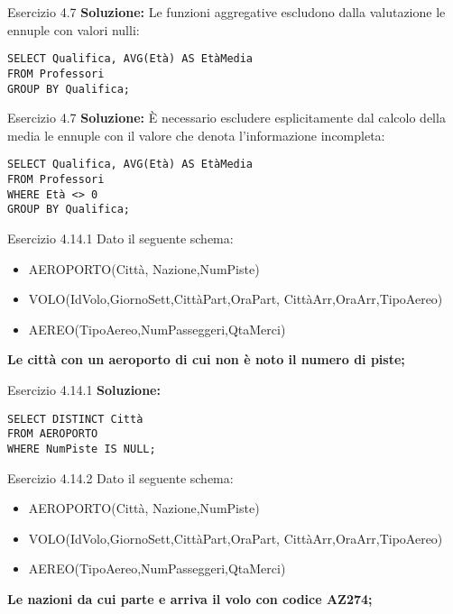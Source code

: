 \begin{frame}{Esercizio 4.7}
    \textbf{Soluzione:}
    Le funzioni aggregative escludono dalla valutazione le ennuple con valori nulli:
    \vspace{1em}
    
    \texttt{SELECT Qualifica, AVG(Et\`a) AS Et\`aMedia\\FROM Professori\\GROUP BY Qualifica;}
\end{frame}

\begin{frame}{Esercizio 4.7}
    \textbf{Soluzione:}
    \`E necessario escludere esplicitamente dal calcolo della media le ennuple con il valore che denota l'informazione incompleta:
    \vspace{1em}
    
    \texttt{SELECT Qualifica, AVG(Et\`a) AS Et\`aMedia\\FROM Professori\\WHERE Et\`a <> 0\\GROUP BY Qualifica;}
\end{frame}
\begin{frame}{Esercizio 4.14.1}
    Dato il seguente schema:
    \begin{itemize}
        \item AEROPORTO(Citt\`a, Nazione,NumPiste)
        \item VOLO(IdVolo,GiornoSett,Citt\`aPart,OraPart,
        Citt\`aArr,OraArr,TipoAereo)
        \item AEREO(TipoAereo,NumPasseggeri,QtaMerci)
    \end{itemize}
    \vspace{1em}
    
    \textbf{Le citt\`a con un aeroporto di cui non \`e noto il numero di piste;}
\end{frame}

\begin{frame}{Esercizio 4.14.1}
    \textbf{Soluzione:}
    \vspace{1em}
    
    \texttt{SELECT DISTINCT Citt\`a\\FROM AEROPORTO\\WHERE NumPiste IS NULL;}
    \end{frame}
\begin{frame}{Esercizio 4.14.2}
    Dato il seguente schema:
    \begin{itemize}
        \item AEROPORTO(Citt\`a, Nazione,NumPiste)
        \item VOLO(IdVolo,GiornoSett,Citt\`aPart,OraPart,
        Citt\`aArr,OraArr,TipoAereo)
        \item AEREO(TipoAereo,NumPasseggeri,QtaMerci)
    \end{itemize}
    \vspace{1em}
    
    \textbf{Le nazioni da cui parte e arriva il volo con codice AZ274;}
\end{frame}

